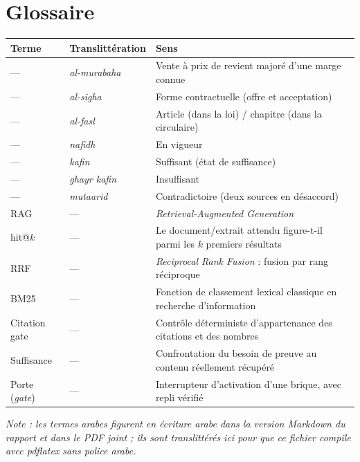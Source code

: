 \documentclass[a4paper,12pt]{report}
\begin{document}
\appendix
\chapter{Glossaire}
\begin{table}[H]
\centering
\small
\begin{tabular}{p{3.0cm}p{3.0cm}p{8.5cm}}
\toprule
\textbf{Terme} & \textbf{Translittération} & \textbf{Sens} \\
\midrule
--- & \emph{al-murabaha} & Vente à prix de revient majoré d'une marge connue \\
--- & \emph{al-sigha} & Forme contractuelle (offre et acceptation) \\
--- & \emph{al-fasl} & Article (dans la loi) / chapitre (dans la circulaire) \\
--- & \emph{nafidh} & En vigueur \\
--- & \emph{kafin} & Suffisant (état de suffisance) \\
--- & \emph{ghayr kafin} & Insuffisant \\
--- & \emph{mutaarid} & Contradictoire (deux sources en désaccord) \\
RAG & --- & \emph{Retrieval-Augmented Generation} \\
hit@$k$ & --- & Le document/extrait attendu figure-t-il parmi les $k$ premiers résultats \\
RRF & --- & \emph{Reciprocal Rank Fusion} : fusion par rang réciproque \\
BM25 & --- & Fonction de classement lexical classique en recherche d'information \\
Citation gate & --- & Contrôle déterministe d'appartenance des citations et des nombres \\
Suffisance & --- & Confrontation du besoin de preuve au contenu réellement récupéré \\
Porte (\emph{gate}) & --- & Interrupteur d'activation d'une brique, avec repli vérifié \\
\bottomrule
\end{tabular}
\end{table}

\emph{Note : les termes arabes figurent en écriture arabe dans la version Markdown du rapport et
dans le PDF joint ; ils sont translittérés ici pour que ce fichier compile avec pdflatex sans
police arabe.}
\end{document}
